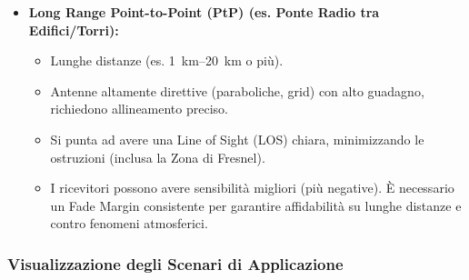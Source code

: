 \begin{itemize}
    \item \textbf{Long Range Point-to-Point (PtP) (es. Ponte Radio tra Edifici/Torri):}
    \begin{itemize}
        \item Lunghe distanze (es. \SIrange{1}{20}{\kilo\meter} o più).
        \item Antenne altamente direttive (paraboliche, grid) con alto guadagno, richiedono allineamento preciso.
        \item Si punta ad avere una Line of Sight (LOS) chiara, minimizzando le ostruzioni (inclusa la Zona di Fresnel).
        \item I ricevitori possono avere sensibilità migliori (più negative). È necessario un Fade Margin consistente per garantire affidabilità su lunghe distanze e contro fenomeni atmosferici.
    \end{itemize}
\end{itemize}

\subsubsection{Visualizzazione degli Scenari di Applicazione}

